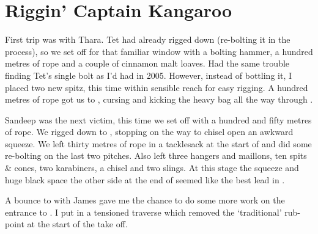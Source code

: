 \section{Riggin' Captain Kangaroo}


First trip was with Thara. Tet had already rigged down  (re-bolting
it in the process), so we set off for that familiar window with a
bolting hammer, a hundred metres of rope and a couple of cinnamon malt
loaves. Had the same trouble finding Tet's single bolt as I'd had in
2005. However, instead of bottling it, I placed two new spitz, this time
within sensible reach for easy rigging. A hundred metres of rope got us
to , cursing and kicking the heavy bag all the way
through .



Sandeep was the next victim, this time we set off with a hundred and
fifty metres of rope. We rigged down to , stopping on the
way to chisel open an awkward squeeze. We left thirty metres of rope in
a tacklesack at the start of  and did some re-bolting on the
last two pitches. Also left three hangers and maillons, ten spits \&
cones, two karabiners, a chisel and two slings. At this stage the
squeeze and huge black space the other side at the end of 
seemed like the best lead in .

A bounce to  with James gave me the chance to do some more work on
the entrance to . I put in a tensioned traverse which
removed the `traditional' rub-point at the start of the take off.

